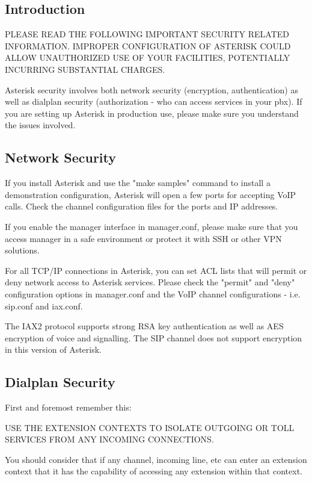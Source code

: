 \subsection{Introduction}

PLEASE READ THE FOLLOWING IMPORTANT SECURITY RELATED INFORMATION.
IMPROPER CONFIGURATION OF ASTERISK COULD ALLOW UNAUTHORIZED USE OF YOUR
FACILITIES, POTENTIALLY INCURRING SUBSTANTIAL CHARGES.

Asterisk security involves both network security (encryption, authentication)
as well as dialplan security (authorization - who can access services in
your pbx). If you are setting up Asterisk in production use, please make
sure you understand the issues involved.

\subsection{Network Security}

If you install Asterisk and use the "make samples" command to install
a demonstration configuration, Asterisk will open a few ports for accepting
VoIP calls. Check the channel configuration files for the ports and IP addresses.

If you enable the manager interface in manager.conf, please make sure that
you access manager in a safe environment or protect it with SSH or other
VPN solutions.

For all TCP/IP connections in Asterisk, you can set ACL lists that
will permit or deny network access to Asterisk services. Please check
the "permit" and "deny" configuration options in manager.conf and
the VoIP channel configurations - i.e. sip.conf and iax.conf.

The IAX2 protocol supports strong RSA key authentication as well as
AES encryption of voice and signalling. The SIP channel does not
support encryption in this version of Asterisk.

\subsection{Dialplan Security}

First and foremost remember this:

USE THE EXTENSION CONTEXTS TO ISOLATE OUTGOING OR TOLL SERVICES FROM ANY
INCOMING CONNECTIONS.

You should consider that if any channel, incoming line, etc can enter an
extension context that it has the capability of accessing any extension
within that context.

